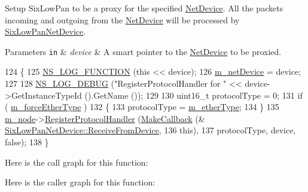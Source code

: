 Setup Six\+Low\+Pan to be a proxy for the specified \hyperlink{classns3_1_1NetDevice}{Net\+Device}. All the packets incoming and outgoing from the \hyperlink{classns3_1_1NetDevice}{Net\+Device} will be processed by \hyperlink{classns3_1_1SixLowPanNetDevice}{Six\+Low\+Pan\+Net\+Device}. 


\begin{DoxyParams}[1]{Parameters}
\mbox{\tt in}  & {\em device} & A smart pointer to the \hyperlink{classns3_1_1NetDevice}{Net\+Device} to be proxied. \\
\hline
\end{DoxyParams}

\begin{DoxyCode}
124 \{
125   \hyperlink{log-macros-disabled_8h_a90b90d5bad1f39cb1b64923ea94c0761}{NS\_LOG\_FUNCTION} (\textcolor{keyword}{this} << device);
126   \hyperlink{classns3_1_1SixLowPanNetDevice_a758b615a8b8f811ae3517ab9c7574f7b}{m\_netDevice} = device;
127 
128   \hyperlink{group__logging_ga413f1886406d49f59a6a0a89b77b4d0a}{NS\_LOG\_DEBUG} (\textcolor{stringliteral}{"RegisterProtocolHandler for "} << device->GetInstanceTypeId ().GetName ());
129 
130   uint16\_t protocolType = 0;
131   \textcolor{keywordflow}{if} ( \hyperlink{classns3_1_1SixLowPanNetDevice_a57d9f56656023ad738e092ba9f668192}{m\_forceEtherType} )
132     \{
133       protocolType = \hyperlink{classns3_1_1SixLowPanNetDevice_afdea8e77d8ec66aef94e8cdbb645004b}{m\_etherType};
134     \}
135   \hyperlink{classns3_1_1SixLowPanNetDevice_a3f287ff63be440ab2978697b1d9b26a5}{m\_node}->\hyperlink{classns3_1_1Node_af713f0e7ea5c49b4fa0b3613405c45fa}{RegisterProtocolHandler} (\hyperlink{group__makecallbackmemptr_ga9376283685aa99d204048d6a4b7610a4}{MakeCallback} (&
      \hyperlink{classns3_1_1SixLowPanNetDevice_a35d31ab6c6270f1923ce5b0f77d582b6}{SixLowPanNetDevice::ReceiveFromDevice},
136                                                  \textcolor{keyword}{this}),
137                                    protocolType, device, \textcolor{keyword}{false});
138 \}
\end{DoxyCode}


Here is the call graph for this function\+:




Here is the caller graph for this function\+:


